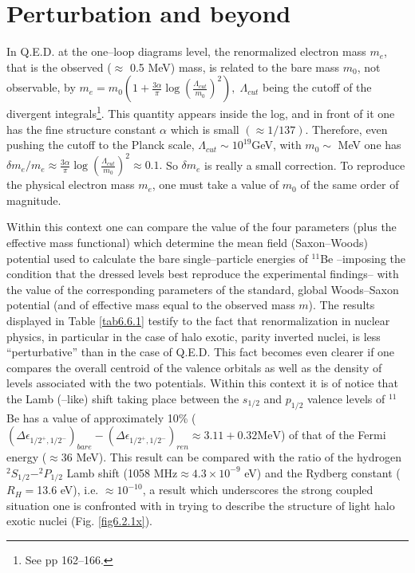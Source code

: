 \section{Perturbation and beyond}\label{S6.6}
In Q.E.D. at the one--loop diagrams level, the renormalized electron mass $m_e$, that is the observed ($\approx$ 0.5 MeV) mass, is related to the bare mass $m_0$, not observable, by $m_e=m_0\left(1+\frac{3\alpha}{\pi}\log\left(\frac{\Lambda_{cut}}{m_0}\right)^2\right), \;\Lambda_{cut}$ being the cutoff of the divergent integrals\footnote{See \cite{Bjorken:98} pp 162--166.}. This quantity appears inside the log, and in front of it one has the fine structure constant $\alpha$ which is small $(\approx1/137)$. Therefore, even pushing the cutoff to the Planck scale, $\Lambda_{cut}\sim10^{19}$GeV, with $m_0\sim$ MeV one has $\delta m_e/m_e\approx\frac{3\alpha}{\pi}\log\left(\frac{\Lambda_{cut}}{m_0}\right)^2\approx 0.1.$ So $\delta m_e$ is really a small correction. To reproduce the physical electron mass $m_e$, one must take a value of $m_0$ of the same order of magnitude. 


Within this context one can compare the value of the four parameters (plus the effective mass functional) which determine the mean field (Saxon--Woods) potential used to calculate the bare single--particle energies of $^{11}$Be --imposing the condition that the dressed levels  best reproduce the experimental findings-- with the value of the corresponding parameters of the standard, global Woods--Saxon potential (and of effective mass equal to the observed mass $m$). The results displayed in Table \ref{tab6.6.1} testify to the fact that renormalization in nuclear physics, in particular in the case of halo exotic, parity inverted nuclei, is less ``perturbative'' than in the case of Q.E.D. This fact becomes even clearer if one compares the overall centroid of the valence orbitals as well as the density of levels associated with the two potentials. Within this context it is of notice that the Lamb (--like) shift taking place between the $s_{1/2}$ and $p_{1/2}$ valence levels of $^11$Be has a value of approximately 10\% ($(\Delta\epsilon_{1/2^+,1/2^-})_{bare}-(\Delta\epsilon_{1/2^+,1/2^-})_{ren}\approx3.11+0.32\text{MeV}$) of that of the Fermi energy ($\approx36$ MeV). This result can be compared with the ratio of the hydrogen $^2S_{1/2}-^2P_{1/2}$ Lamb shift (1058 MHz$\approx4.3\times10^{-9}$ eV) and the Rydberg constant ($R_H=$13.6 eV), i.e. $\approx10^{-10}$, a result which underscores the strong coupled situation one is confronted with in trying to describe the structure of light halo exotic nuclei (Fig. \ref{fig6.2.1x}).

